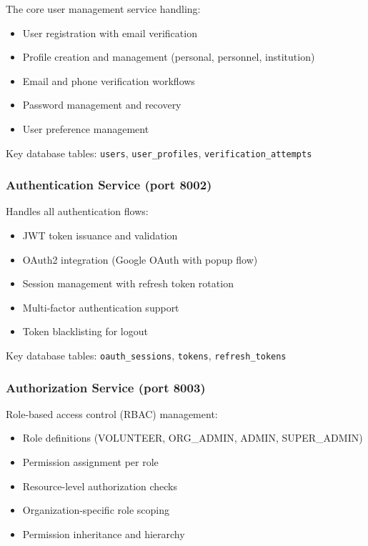 \documentclass[11pt,a4paper]{article}
\begin{document}
The core user management service handling:
\begin{itemize}
  \item User registration with email verification
  \item Profile creation and management (personal, personnel, institution)
  \item Email and phone verification workflows
  \item Password management and recovery
  \item User preference management
\end{itemize}

Key database tables: \texttt{users}, \texttt{user\_profiles}, \texttt{verification\_attempts}

\subsubsection{Authentication Service (port 8002)}

Handles all authentication flows:
\begin{itemize}
  \item JWT token issuance and validation
  \item OAuth2 integration (Google OAuth with popup flow)
  \item Session management with refresh token rotation
  \item Multi-factor authentication support
  \item Token blacklisting for logout
\end{itemize}

Key database tables: \texttt{oauth\_sessions}, \texttt{tokens}, \texttt{refresh\_tokens}

\subsubsection{Authorization Service (port 8003)}

Role-based access control (RBAC) management:
\begin{itemize}
  \item Role definitions (VOLUNTEER, ORG\_ADMIN, ADMIN, SUPER\_ADMIN)
  \item Permission assignment per role
  \item Resource-level authorization checks
  \item Organization-specific role scoping
  \item Permission inheritance and hierarchy
\end{itemize}
\end{document}
